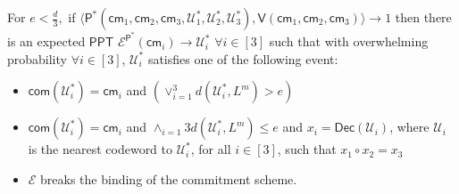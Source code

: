 \documentclass[runningheads]{llncs}
\newcommand{\innp}[2]{\langle #1,#2\rangle}
\def\ppt{\mathsf{PPT}}
\def\extrac{\mathcal{E}} %
\def\prover{\mathsf{P}}
\def\verifier{\mathsf{V}}
\def\cm{\mathsf{cm}} %
\def\com{\mathsf{com}} %
\def\dec{\mathsf{Dec}}
\def\calU{\mathcal{U}}
\begin{document}
	\begin{theorem}
		For $ e < \frac{d}{3}, $ if $\innp{\prover^*(\cm_1, \cm_2, \cm_3 , \calU^*_1	, \calU^*_2, \calU^*_3)}{\verifier(\cm_1, \cm_2, \cm_3)} \rightarrow 1$ then there is an expected $\ppt$  $\extrac^{\prover^*}(\cm_i)\rightarrow \calU^*_i$ $\forall i\in [3]$ such that with overwhelming probability $\forall i \in [3]$, $\calU^*_i$ satisfies one of the following event: 
		\begin{itemize}
			\item $\com(\calU^*_i) = \cm_i$ and $(\vee_{i=1}^{3} d(\calU^*_i, L^m)> e)$ 
			\item $\com(\calU^*_i) = \cm_i$ and $\wedge_{i=1}{3} d(\calU^*_i,L^m)\leq e$ and $ x_i = \dec(\calU_i)$, where $\calU_i$ is the nearest codeword to $\calU^*_i$, for all $i\in [3]$, such that $x_1 \circ x_2 = x_3$
			\item $\extrac$ breaks the binding of the commitment scheme.
		\end{itemize} 
	
	\end{theorem}
\end{document}
